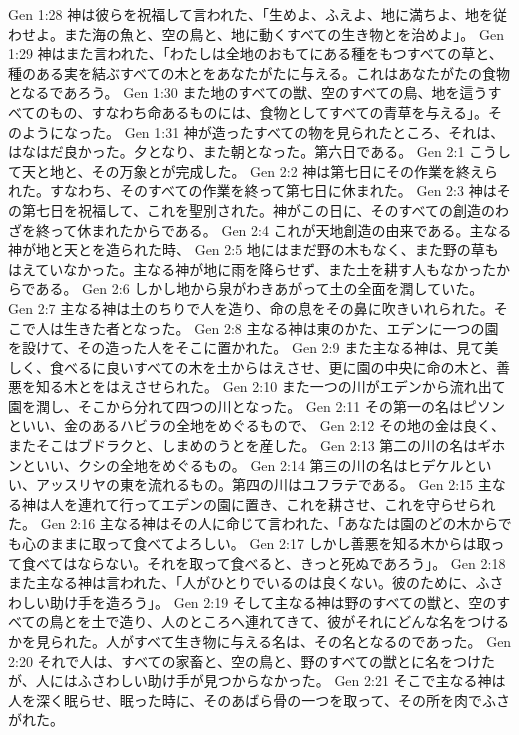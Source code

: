 Gen 1:28  神は彼らを祝福して言われた、「生めよ、ふえよ、地に満ちよ、地を従わせよ。また海の魚と、空の鳥と、地に動くすべての生き物とを治めよ」。
Gen 1:29  神はまた言われた、「わたしは全地のおもてにある種をもつすべての草と、種のある実を結ぶすべての木とをあなたがたに与える。これはあなたがたの食物となるであろう。
Gen 1:30  また地のすべての獣、空のすべての鳥、地を這うすべてのもの、すなわち命あるものには、食物としてすべての青草を与える」。そのようになった。
Gen 1:31  神が造ったすべての物を見られたところ、それは、はなはだ良かった。夕となり、また朝となった。第六日である。
Gen 2:1  こうして天と地と、その万象とが完成した。
Gen 2:2  神は第七日にその作業を終えられた。すなわち、そのすべての作業を終って第七日に休まれた。
Gen 2:3  神はその第七日を祝福して、これを聖別された。神がこの日に、そのすべての創造のわざを終って休まれたからである。
Gen 2:4  これが天地創造の由来である。主なる神が地と天とを造られた時、
Gen 2:5  地にはまだ野の木もなく、また野の草もはえていなかった。主なる神が地に雨を降らせず、また土を耕す人もなかったからである。
Gen 2:6  しかし地から泉がわきあがって土の全面を潤していた。
Gen 2:7  主なる神は土のちりで人を造り、命の息をその鼻に吹きいれられた。そこで人は生きた者となった。
Gen 2:8  主なる神は東のかた、エデンに一つの園を設けて、その造った人をそこに置かれた。
Gen 2:9  また主なる神は、見て美しく、食べるに良いすべての木を土からはえさせ、更に園の中央に命の木と、善悪を知る木とをはえさせられた。
Gen 2:10  また一つの川がエデンから流れ出て園を潤し、そこから分れて四つの川となった。
Gen 2:11  その第一の名はピソンといい、金のあるハビラの全地をめぐるもので、
Gen 2:12  その地の金は良く、またそこはブドラクと、しまめのうとを産した。
Gen 2:13  第二の川の名はギホンといい、クシの全地をめぐるもの。
Gen 2:14  第三の川の名はヒデケルといい、アッスリヤの東を流れるもの。第四の川はユフラテである。
Gen 2:15  主なる神は人を連れて行ってエデンの園に置き、これを耕させ、これを守らせられた。
Gen 2:16  主なる神はその人に命じて言われた、「あなたは園のどの木からでも心のままに取って食べてよろしい。
Gen 2:17  しかし善悪を知る木からは取って食べてはならない。それを取って食べると、きっと死ぬであろう」。
Gen 2:18  また主なる神は言われた、「人がひとりでいるのは良くない。彼のために、ふさわしい助け手を造ろう」。
Gen 2:19  そして主なる神は野のすべての獣と、空のすべての鳥とを土で造り、人のところへ連れてきて、彼がそれにどんな名をつけるかを見られた。人がすべて生き物に与える名は、その名となるのであった。
Gen 2:20  それで人は、すべての家畜と、空の鳥と、野のすべての獣とに名をつけたが、人にはふさわしい助け手が見つからなかった。
Gen 2:21  そこで主なる神は人を深く眠らせ、眠った時に、そのあばら骨の一つを取って、その所を肉でふさがれた。

